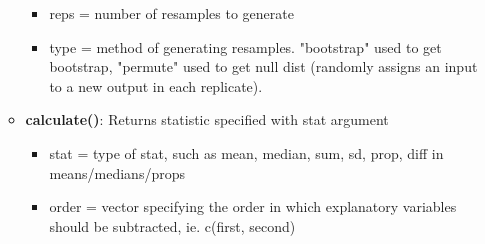 \documentclass[8pt,landscape,a4paper, fleqn, dvipsnames]{extarticle}
\begin{document}
\begin{multicols*}{4}
\begin{itemize}
\begin{itemize}
\begin{itemize}
            \item reps = number of resamples to generate
            \item type = method of generating resamples. "bootstrap" used to get bootstrap, "permute" used to get null dist (randomly assigns an input to a new output in each replicate).
        \end{itemize}
        \item \textbf{calculate()}: Returns statistic specified with stat argument
        \begin{itemize}
            \item stat = type of stat, such as mean, median, sum, sd, prop, diff in means/medians/props
            \item order = vector specifying the order in which explanatory variables should be subtracted, ie. c(first, second)
        \end{itemize}
    \end{itemize}


\end{itemize}
\end{multicols*}
\end{document}
